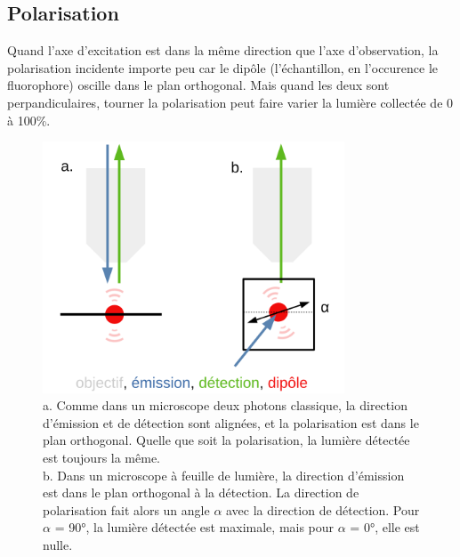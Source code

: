 \subsection{Polarisation}


Quand l'axe d'excitation est dans la même direction que l'axe d'observation, la polarisation incidente importe peu car le dipôle (l'échantillon, en l'occurence le fluorophore) oscille dans le plan orthogonal. Mais quand les deux sont perpandiculaires, tourner la polarisation peut faire varier la lumière collectée de 0 à 100\%.

\begin{figure}
\centering
\includegraphics[width=0.8\textwidth]{./files/polarization_plane.svg.png}
\caption{a. Comme dans un microscope deux photons classique, la direction d'émission et de détection sont alignées, et la polarisation est dans le plan orthogonal. Quelle que soit la polarisation, la lumière détectée est toujours la même.
\\ b. Dans un microscope à feuille de lumière, la direction d'émission est dans le plan orthogonal à la détection. La direction de polarisation fait alors un angle $\alpha$ avec la direction de détection. Pour $\alpha$ = 90°, la lumière détectée est maximale, mais pour $\alpha$ = 0°, elle est nulle.}
\end{figure}


